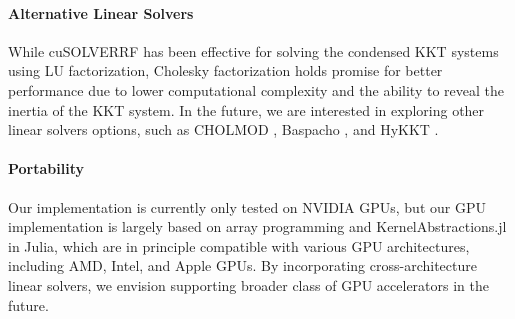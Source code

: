 \paragraph*{Alternative Linear Solvers}
While cuSOLVERRF has been effective for solving the condensed KKT
systems using LU factorization, Cholesky factorization holds promise
for better performance due to lower computational complexity and the
ability to reveal the inertia of the KKT system. In the future, we are
interested in exploring other linear solvers options, such as CHOLMOD
\cite{chen2008algorithm}, Baspacho \cite{pineda2022theseus}, and HyKKT
\cite{regev2023hykkt}.

\paragraph*{Portability}
Our implementation is currently only tested on NVIDIA GPUs, but our
GPU implementation is largely based on array programming and
KernelAbstractions.jl in Julia, which are in principle  compatible with
various GPU architectures, including AMD, Intel, and Apple GPUs. By
incorporating cross-architecture linear solvers, we envision
supporting broader class of GPU accelerators in the future.




\vspace{0.1cm}
\begin{flushright}
	\scriptsize {}
	\normalsize
\end{flushright}




